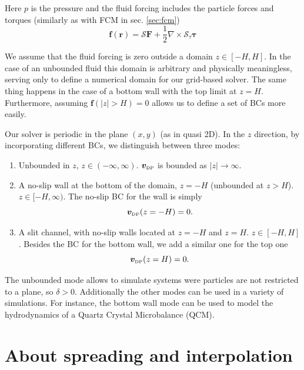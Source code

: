 \documentclass[ twoside,openright,titlepage,numbers=noenddot,%
headinclude,footinclude,cleardoublepage=empty,abstract=on,
BCOR=5mm,paper=a4,fontsize=11pt, dvipsnames
]{scrreprt}
\renewcommand{\vec}[1]{\bm{#1}}
\newcommand{\oper}[1]{\mathcal{#1}}
\newcommand{\half}{\frac{1}{2}}
\newcommand{\fpos}{r}
\newcommand{\fvel}{v}
\newcommand{\dpr}{\text{\tiny DP}}
\begin{document}
Here $p$ is the pressure and the fluid forcing includes the particle forces and torques (similarly as with \gls{FCM} in sec. \ref{sec:fcm})
\begin{equation}
  \vec{f}(\vec{\fpos}) = \oper{S}\vec{F} + \half\nabla\times\oper{S}_{\tau}\vec{\tau}
\end{equation}

We assume that the fluid forcing is zero outside a domain $z\in [-H, H]$. In the case of an unbounded fluid this domain is arbitrary and physically meaningless, serving only to define a numerical domain for our grid-based solver. The same thing happens in the case of a bottom wall with the top limit at $z=H$. Furthermore, assuming $\vec{f}(|z|>H) = 0$ allows us to define a set of \glspl{BC} more easily.

Our solver is periodic in the plane $(x,y)$ (as in quasi 2D). In the $z$ direction, by incorporating different \glspl{BC}, we distinguish between three modes:
\begin{enumerate}
\item Unbounded in $z$, $z\in(-\infty, \infty)$. $\vec{\fvel}_{\dpr}$ is bounded as $|z|\rightarrow\infty$.
\item A no-slip  wall at the bottom of the domain, $z=-H$ (unbounded at $z>H$). $z\in [-H, \infty)$.
  The no-slip \gls{BC} for the wall is simply
  \begin{equation}
    \label{eq:dpstokesbwvelbc}
    \vec{\fvel}_{\dpr}(z=-H) = 0.   
  \end{equation} 
\item A slit channel, with no-slip walls located at $z=-H$ and $z=H$. $z\in [-H, H]$. Besides the \gls{BC} for the bottom wall, we add a similar one for the top one
  \begin{equation}
    \label{eq:dpstokestwvelbc}
    \vec{\fvel}_{\dpr}(z=H) = 0.
  \end{equation}
\end{enumerate}
The unbounded mode allows to simulate systems were particles are not restricted to a plane, so $\delta>0$. Additionally the other modes can be used in a variety of simulations. For instance, the bottom wall mode can be used to model the hydrodynamics of a Quartz Crystal Microbalance (QCM).

\section{About spreading and interpolation}
\end{document}
